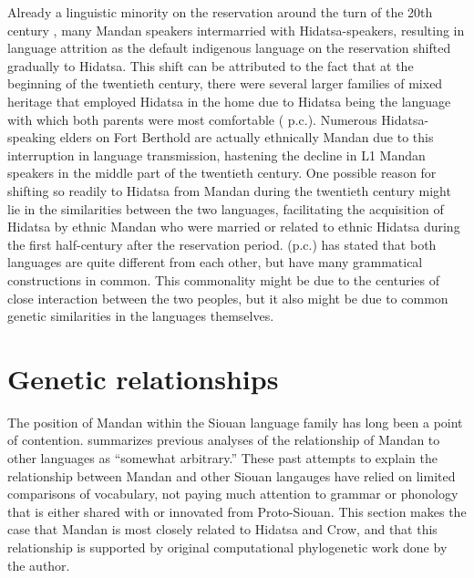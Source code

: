 Already a linguistic minority on the reservation around the turn of the 20th century \citep[2]{kennard1936}, many Mandan speakers intermarried with Hidatsa-speakers, resulting in language attrition as the default indigenous language on the reservation shifted gradually to Hidatsa. This shift can be attributed to the fact that at the beginning of the twentieth century, there were several larger families of mixed heritage that employed Hidatsa in the home due to Hidatsa being the language with which both parents were most comfortable (\citeauthor{birdbear2016} p.c.). Numerous Hidatsa-speaking elders on Fort Berthold are actually ethnically Mandan due to this interruption in language transmission, hastening the decline in L1 Mandan speakers in the middle part of the twentieth century. One possible reason for shifting so readily to Hidatsa from Mandan during the twentieth century might lie in the similarities between the two languages, facilitating the acquisition of Hidatsa by ethnic Mandan who were married or related to ethnic Hidatsa during the first half-century after the reservation period. \citeauthor{benson2000} (p.c.) has stated that both languages are quite different from each other, but have many grammatical constructions in common. This commonality might be due to the centuries of close interaction between the two peoples, but it also might be due to common genetic similarities in the languages themselves.


\section{Genetic relationships}\label{genetics}

The position of Mandan within the Siouan language family has long been a point of contention. \citet[16]{grimm2012} summarizes previous analyses of the relationship of Mandan to other languages as ``somewhat arbitrary.'' These past attempts to explain the relationship between Mandan and other Siouan langauges have relied on limited comparisons of vocabulary, not paying much attention to grammar or phonology that is either shared with or innovated from Proto-Siouan. This section makes the case that Mandan is most closely related to Hidatsa and Crow, and that this relationship is supported by original computational phylogenetic work done by the author. 

